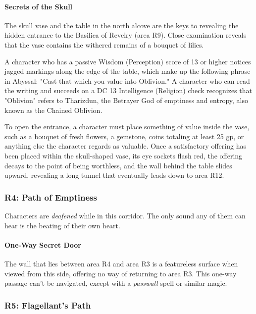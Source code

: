 \documentclass[a4paper, 11pt, bg=full, twocolumn, nooutline]{dndbook}
\begin{document}
\paragraph{Secrets of the Skull}

The skull vase and the table in the north alcove are the keys to revealing the hidden entrance to the Basilica of Revelry (area R9). Close examination reveals that the vase contains the withered remains of a bouquet of lilies.

A character who has a passive Wisdom (Perception) score of 13 or higher notices jagged markings along the edge of the table, which make up the following phrase in Abyssal: "Cast that which you value into Oblivion." A character who can read the writing and succeeds on a DC 13 Intelligence (Religion) check recognizes that "Oblivion" refers to Tharizdun, the Betrayer God of emptiness and entropy, also known as the Chained Oblivion.

To open the entrance, a character must place something of value inside the vase, such as a bouquet of fresh flowers, a gemstone, coins totaling at least 25 gp, or anything else the character regards as valuable. Once a satisfactory offering has been placed within the skull-shaped vase, its eye sockets flash red, the offering decays to the point of being worthless, and the wall behind the table slides upward, revealing a long tunnel that eventually leads down to area R12.

\subsubsection{R4: Path of Emptiness}

Characters are \textit{deafened} while in this corridor. The only sound any of them can hear is the beating of their own heart.

\paragraph{One-Way Secret Door}

The wall that lies between area R4 and area R3 is a featureless surface when viewed from this side, offering no way of returning to area R3. This one-way passage can't be navigated, except with a \textit{passwall} spell or similar magic.

\subsubsection{R5: Flagellant's Path}
\end{document}
